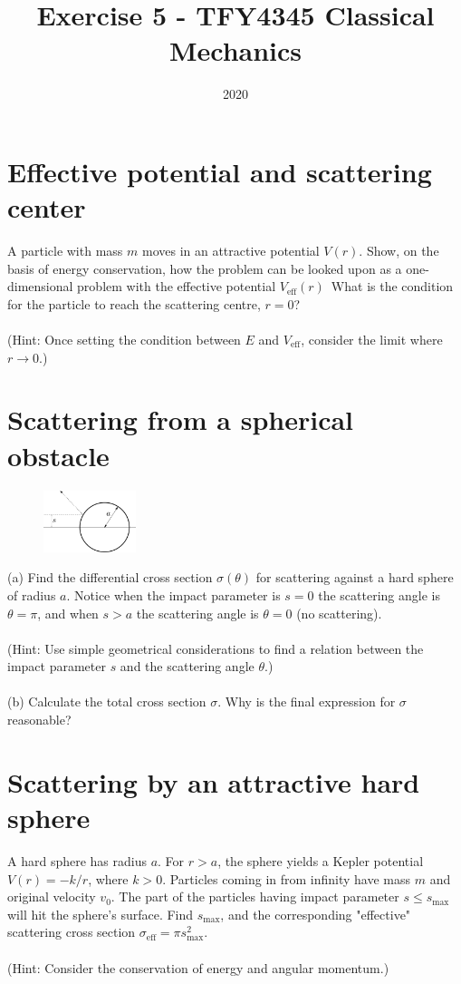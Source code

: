 \documentclass{article}
\title{Exercise 5 - TFY4345 Classical Mechanics}
\date{2020}
\begin{document}
    \maketitle
    \section{Effective potential and scattering center}
        A particle with mass $m$ moves in an attractive potential $V(r)$. Show, on the basis of energy conservation, how the problem can be looked upon as a one-dimensional problem with the effective potential $V_\mathrm{eff}(r)$ What is the condition for the particle to reach the scattering centre, $r=0$? \\ \\
    (Hint: Once setting the condition between $E$ and $V_\mathrm{eff}$, consider the limit where $r \rightarrow 0$.)

    \section{Scattering from a spherical obstacle}
        \begin{figure}
            \vspace{-1cm}
            \includegraphics[width=0.24\textwidth]{figures/figure_1.pdf}
            \vspace{-1cm}
        \end{figure}
        (a) Find the differential cross section $\sigma(\theta)$ for scattering against a hard sphere of radius $a$. Notice when the impact parameter is $s = 0$ the scattering angle is $\theta = \pi$, and when $s > a$ the scattering angle is $\theta = 0$ (no scattering). \\ \\
        (Hint: Use simple geometrical considerations to find a relation between the impact parameter $s$ and the scattering angle $\theta$.) \\ \\
        (b) Calculate the total cross section $\sigma$. Why is the final expression for $\sigma$ reasonable?

    \section{Scattering by an attractive hard sphere}
        A hard sphere has radius $a$. For $r > a$, the sphere yields a Kepler potential $V(r) = - k/r$, where $k>0$. Particles coming in from infinity have mass $m$ and original velocity $v_0$. The part of the particles having impact parameter $s \leq s_{\mathrm{max}}$ will hit the sphere's surface. Find $s_{\mathrm{max}}$, and the corresponding "effective" scattering cross section $\sigma_\mathrm{eff} = \pi s_{\mathrm{max}}^2$. \\ \\
        (Hint: Consider the conservation of energy and angular momentum.)
\end{document}

